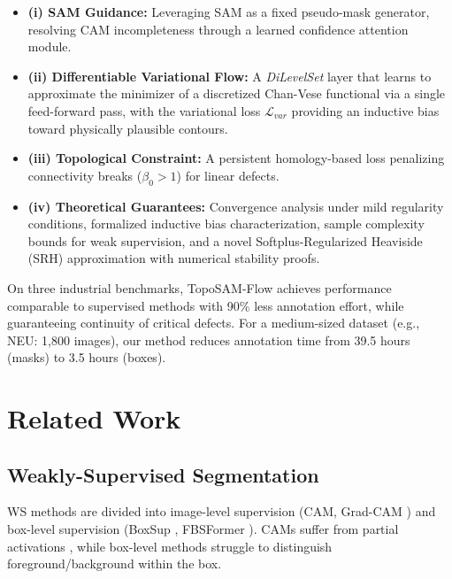 \documentclass[12pt, a4paper]{article}
\begin{document}
\begin{itemize}
    \item \textbf{(i) SAM Guidance:} Leveraging SAM as a fixed pseudo-mask generator, resolving CAM incompleteness through a learned confidence attention module.
    \item \textbf{(ii) Differentiable Variational Flow:} A \textit{DiLevelSet} layer that learns to approximate the minimizer of a discretized Chan-Vese functional via a single feed-forward pass, with the variational loss $\mathcal{L}_{var}$ providing an inductive bias toward physically plausible contours.
    \item \textbf{(iii) Topological Constraint:} A persistent homology-based loss penalizing connectivity breaks ($\beta_0 > 1$) for linear defects.
    \item \textbf{(iv) Theoretical Guarantees:} Convergence analysis under mild regularity conditions, formalized inductive bias characterization, sample complexity bounds for weak supervision, and a novel Softplus-Regularized Heaviside (SRH) approximation with numerical stability proofs.
\end{itemize}

On three industrial benchmarks, TopoSAM-Flow achieves performance comparable to supervised methods with 90\% less annotation effort, while guaranteeing continuity of critical defects. For a medium-sized dataset (e.g., NEU: 1,800 images), our method reduces annotation time from 39.5 hours (masks) to 3.5 hours (boxes).

\section{Related Work}
\label{sec:related_work}

\subsection{Weakly-Supervised Segmentation}
\label{subsec:weakly_supervised}

WS methods are divided into image-level supervision (CAM, Grad-CAM \cite{selvaraju2017grad}) and box-level supervision (BoxSup \cite{dai2015boxsup}, FBSFormer \cite{shi2024fbsformer}). CAMs suffer from partial activations \cite{review2025}, while box-level methods struggle to distinguish foreground/background within the box.
\end{document}
